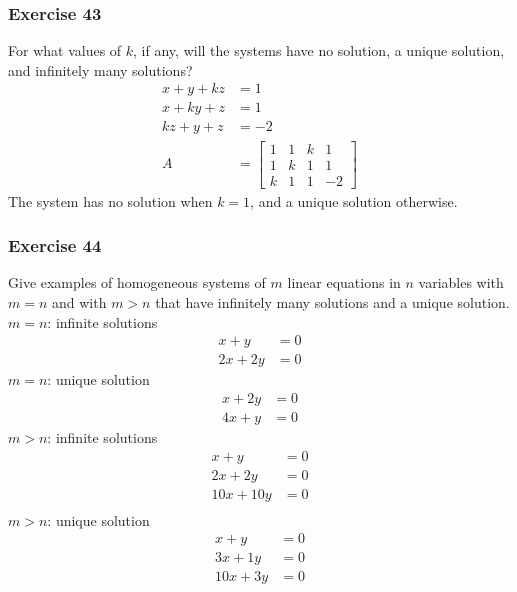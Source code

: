 \documentclass[letterpaper, 12pt]{math}
\begin{document}
\subsubsection*{Exercise 43}
For what values of \( k \), if any, will the systems have no solution, a unique
solution, and infinitely many solutions?
\begin{align*}
  x+y+kz &= 1 \\
  x+ky+z &= 1 \\
  kz+y+z &= -2 \\
  A &= \begin{bmatrix}
    1 & 1 & k & 1 \\
    1 & k & 1 & 1 \\
    k & 1 & 1 & -2
  \end{bmatrix}
\end{align*}
The system has no solution when \( k = 1 \), and a unique solution otherwise.

\subsubsection*{Exercise 44}
Give examples of homogeneous systems of \( m \) linear equations in \( n \)
variables with \( m = n \) and with \( m > n \) that have infinitely many
solutions and a unique solution. \\
\( m = n \): infinite solutions
\begin{align*}
  x+y &= 0 \\
  2x+2y &= 0
\end{align*}
\( m = n \): unique solution
\begin{align*}
  x+2y &= 0 \\
  4x+y &= 0
\end{align*}
\( m > n \): infinite solutions
\begin{align*}
  x+y &= 0 \\
  2x+2y &= 0 \\
  10x+10y &= 0 \\
\end{align*}
\( m > n \): unique solution
\begin{align*}
  x+y &= 0 \\
  3x+1y &= 0 \\
  10x+3y &= 0 \\
\end{align*}
\end{document}
